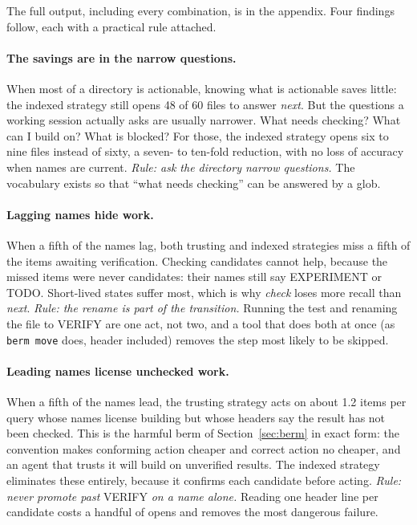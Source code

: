 \documentclass[11pt]{article}
\newcommand{\st}[1]{\textsf{#1}}
\begin{document}
\noindent The full output, including every combination, is in the appendix. Four findings follow, each with a practical rule attached.

\paragraph{The savings are in the narrow questions.} When most of a directory is actionable, knowing what is actionable saves little: the indexed strategy still opens 48 of 60 files to answer \emph{next}. But the questions a working session actually asks are usually narrower. What needs checking? What can I build on? What is blocked? For those, the indexed strategy opens six to nine files instead of sixty, a seven- to ten-fold reduction, with no loss of accuracy when names are current. \emph{Rule: ask the directory narrow questions.} The vocabulary exists so that ``what needs checking'' can be answered by a glob.

\paragraph{Lagging names hide work.} When a fifth of the names lag, both trusting and indexed strategies miss a fifth of the items awaiting verification. Checking candidates cannot help, because the missed items were never candidates: their names still say \st{EXPERIMENT} or \st{TODO}. Short-lived states suffer most, which is why \emph{check} loses more recall than \emph{next}. \emph{Rule: the rename is part of the transition.} Running the test and renaming the file to \st{VERIFY} are one act, not two, and a tool that does both at once (as \texttt{berm move} does, header included) removes the step most likely to be skipped.

\paragraph{Leading names license unchecked work.} When a fifth of the names lead, the trusting strategy acts on about 1.2 items per query whose names license building but whose headers say the result has not been checked. This is the harmful berm of Section~\ref{sec:berm} in exact form: the convention makes conforming action cheaper and correct action no cheaper, and an agent that trusts it will build on unverified results. The indexed strategy eliminates these entirely, because it confirms each candidate before acting. \emph{Rule: never promote past} \st{VERIFY} \emph{on a name alone.} Reading one header line per candidate costs a handful of opens and removes the most dangerous failure.
\end{document}
